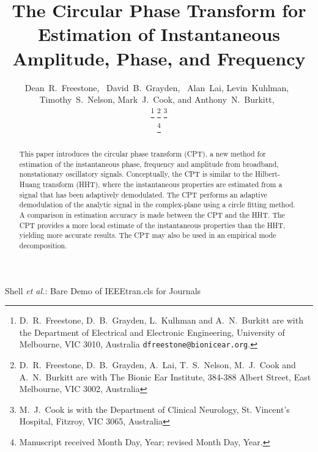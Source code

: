 \documentclass[11pt,draftcls,onecolumn]{IEEEtran}
\begin{document}
\title{The Circular Phase Transform for Estimation of Instantaneous Amplitude, Phase, and Frequency}

\author{Dean~R.~Freestone,~
		David~B.~Grayden,~
        Alan~Lai,
        Levin~Kuhlman,~
        Timothy~S.~Nelson,
        Mark~J.~Cook,
        and Anthony~N.~Burkitt,~
        
\thanks{D.\ R.\ Freestone, D.\ B.\ Grayden, L.\ Kulhman and A.\ N.\ Burkitt are with the Department
of Electrical and Electronic Engineering, University of Melbourne, VIC 3010, Australia {\tt\small dfreestone@bionicear.org}.}  
\thanks{D.\ R.\ Freestone, D.\ B.\ Grayden, A.\ Lai, T.\ S.\ Nelson, M.\ J.\ Cook and A.\ N.\ Burkitt are with The Bionic Ear Institute, 384-388 Albert Street, East Melbourne, VIC 3002, Australia}
\thanks{M.\ J.\ Cook is with the Department of Clinical Neurology, St. Vincent's Hospital, Fitzroy, VIC 3065, Australia}

\thanks{Manuscript received Month Day, Year; revised Month Day, Year.}}

%
{Shell \MakeLowercase{\textit{et al.}}: Bare Demo of IEEEtran.cls for Journals}

\maketitle

\begin{abstract}
This paper introduces the circular phase transform (CPT), a new method for estimation of the instantaneous phase, frequency and amplitude from broadband, nonstationary oscillatory signals. Conceptually, the CPT is similar to the Hilbert-Huang transform (HHT), where the instantaneous properties are estimated from a signal that has been adaptively demodulated. The CPT performs an adaptive demodulation of the analytic signal in the complex-plane using a circle fitting method. A comparison in estimation accuracy is made between the CPT and the HHT. The CPT provides a more local estimate of the instantaneous properties than the HHT, yielding more accurate results. The CPT may also be used in an empirical mode decomposition.
\end{abstract}
\end{document}
